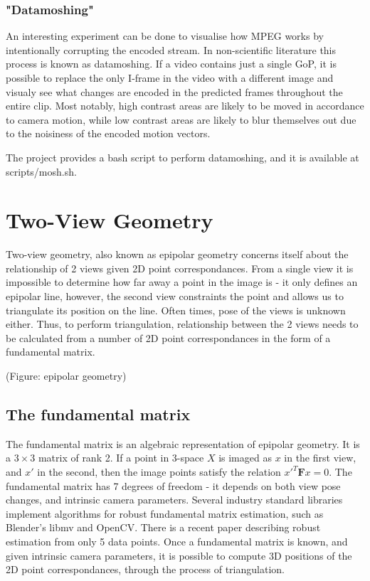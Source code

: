 \documentclass[11pt,english]{report}
\begin{document}
\subsubsection{"Datamoshing"}

An interesting experiment can be done to visualise how MPEG works by intentionally corrupting the encoded stream. In non-scientific literature this process is known as datamoshing. If a video contains just a single GoP, it is possible to replace the only I-frame in the video with a different image and visualy see what changes are encoded in the predicted frames throughout the entire clip. Most notably, high contrast areas are likely to be moved in accordance to camera motion, while low contrast areas are likely to blur themselves out due to the noisiness of the encoded motion vectors.

The project provides a bash script to perform datamoshing, and it is available at scripts/mosh.sh.

\section{Two-View Geometry}

Two-view geometry, also known as epipolar geometry concerns itself about the relationship of 2 views given 2D point correspondances. From a single view it is impossible to determine how far away a point in the image is - it only defines an epipolar line, however, the second view constraints the point and allows us to triangulate its position on the line. Often times, pose of the views is unknown either. Thus, to perform triangulation, relationship between the 2 views needs to be calculated from a number of 2D point correspondances in the form of a fundamental matrix.

(Figure: epipolar geometry)

\subsection{The fundamental matrix}

The fundamental matrix is an algebraic representation of epipolar geometry. It is a $3 \times 3$ matrix of rank 2. If a point in 3-space $X$ is imaged as $x$ in the first view, and $x'$ in the second, then the image points satisfy the relation $x'^T \mathbf{F} x = 0$\cite{hartley_zisserman_2004}. The fundamental matrix has 7 degrees of freedom - it depends on both view pose changes, and intrinsic camera parameters. Several industry standard libraries implement algorithms for robust fundamental matrix estimation, such as Blender's libmv and OpenCV. There is a recent paper describing robust estimation from only 5 data points\cite{8578130}. Once a fundamental matrix is known, and given intrinsic camera parameters, it is possible to compute 3D positions of the 2D point correspondances, through the process of triangulation.
\end{document}

